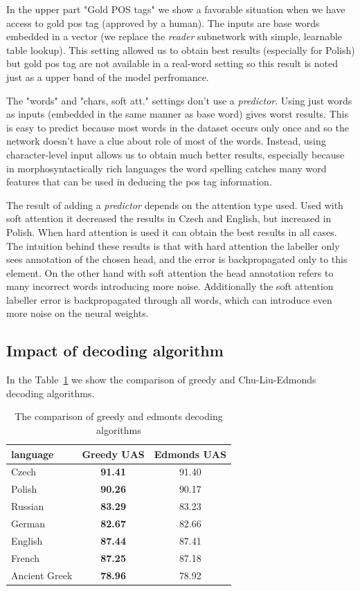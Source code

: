 In the upper part "Gold POS tags" we show a favorable situation when we have access
to gold pos tag (approved by a human). The inputs are base words embedded in a vector 
(we replace the \emph{reader} subnetwork with simple, learnable table lookup).
This setting allowed us to obtain best results (especially for Polish) but
gold pos tag are not available in a real-word setting so this result is noted just
as a upper band of the model perfromance.

The "words" and "chars, soft att." settings don't use a \emph{predictor}. Using just words
as inputs (embedded in the same manner as base word) gives worst results. This is
easy to predict because most words in the dataset occurs only once and so the
network doesn't have a clue about role of most of the words.
Instead, using character-level input allows us to obtain much better results, especially
because in morphosyntactically rich languages the word spelling catches many
word features that can be used in deducing the pos tag information.

The result of adding a \emph{predictor} depends on the attention type used.
Used with soft attention it decreased the results in Czech and English, but increased
in Polish. When hard attention is used it can obtain the best results in all cases.
The intuition behind these results is that with hard attention the labeller only
sees annotation of the chosen head, and the error is backpropagated only to this
element. On the other hand with soft attention the head annotation refers
to many incorrect words introducing more noise. Additionally the soft attention labeller
error is backpropagated through all words, which can introduce even more noise on the neural weights.


\subsection{Impact of decoding algorithm}

In the Table~\ref{tab:edmonts_baseline} we show the comparison of greedy and
Chu-Liu-Edmonds decoding algorithms.

\begin{table}[!htbp]
  \centering
  \begin{tabular}{l | c c}
    language & Greedy UAS & Edmonds UAS \\ \hline
      Czech & \textbf{91.41} & 91.40 \\
      Polish &  \textbf{90.26} & 90.17 \\
      Russian & \textbf{83.29} & 83.23 \\
      German &  \textbf{82.67} & 82.66 \\
      English & \textbf{87.44} & 87.41 \\
      French &  \textbf{87.25} & 87.18 \\
      Ancient Greek & \textbf{78.96} & 78.92
  \end{tabular}
  \caption{The comparison of greedy and edmonts decoding algorithms}
  \label{tab:edmonts_baseline}
\end{table}

